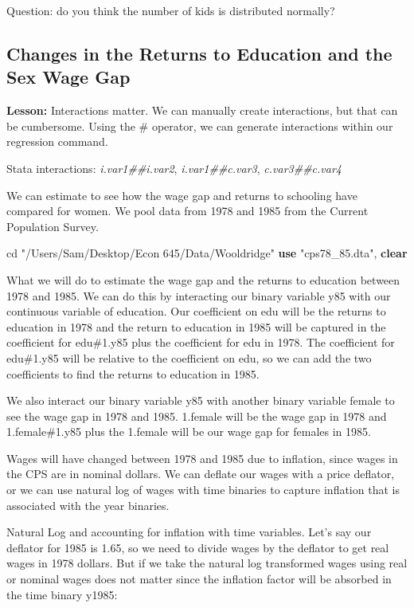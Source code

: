 \documentclass[
]{book}
\newenvironment{Shaded}{\begin{snugshade}}{\end{snugshade}}
\newcommand{\KeywordTok}[1]{\textcolor[rgb]{0.13,0.29,0.53}{\textbf{#1}}}
\newcommand{\NormalTok}[1]{#1}
\newcommand{\StringTok}[1]{\textcolor[rgb]{0.31,0.60,0.02}{#1}}
\begin{document}
Question: do you think the number of kids is distributed normally?

\subsection{Changes in the Returns to Education and the Sex Wage Gap}\label{changes-in-the-returns-to-education-and-the-sex-wage-gap}

\textbf{Lesson:} Interactions matter. We can manually create interactions, but that can be cumbersome. Using the \# operator, we can generate interactions within our regression command.

Stata interactions: \emph{i.var1\#\#i.var2}, \emph{i.var1\#\#c.var3}, \emph{c.var3\#\#c.var4}

We can estimate to see how the wage gap and returns to schooling have compared for women. We pool data from 1978 and 1985 from the Current Population Survey.

\begin{Shaded}
\begin{Highlighting}[]
\NormalTok{cd }\StringTok{"/Users/Sam/Desktop/Econ 645/Data/Wooldridge"}
\KeywordTok{use} \StringTok{"cps78\_85.dta"}\NormalTok{, }\KeywordTok{clear}
\end{Highlighting}
\end{Shaded}

What we will do to estimate the wage gap and the returns to education between 1978 and 1985. We can do this by interacting our binary variable y85 with our continuous variable of education. Our coefficient on edu will be the returns to education in 1978 and the return to education in 1985 will be captured in the coefficient for edu\#1.y85 plus the coefficient for edu in 1978.
The coefficient for edu\#1.y85 will be relative to the coefficient on edu, so we can add the two coefficients to find the returns to education in 1985.

We also interact our binary variable y85 with another binary variable female to see the wage gap in 1978 and 1985. 1.female will be the wage gap in 1978 and 1.female\#1.y85 plus the 1.female
will be our wage gap for females in 1985.

Wages will have changed between 1978 and 1985 due to inflation, since wages in the CPS are in nominal dollars. We can deflate our wages with a price deflator, or we can use natural log of wages with time binaries to capture inflation that is associated with the year binaries.

Natural Log and accounting for inflation with time variables. Let's say our deflator for 1985 is 1.65, so we need to divide wages by the deflator to get real wages in 1978 dollars. But if we take the natural log transformed wages using real or nominal wages does not matter since the inflation factor will be absorbed in the time binary y1985:
\end{document}
